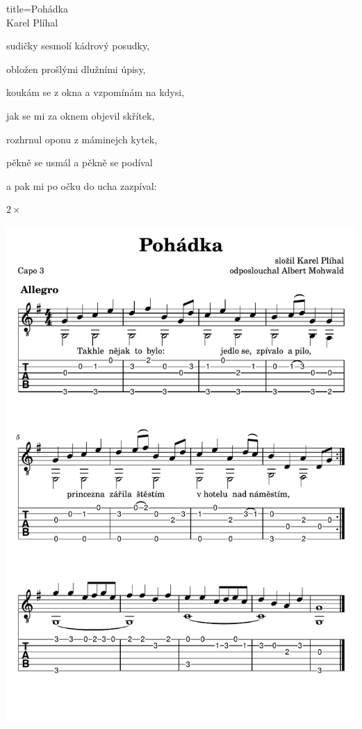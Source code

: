 \begin{song}{title=\predtitle\centering Pohádka \\\large Karel Plíhal\vspace*{-0.5cm}}
\begin{centerjustified}
sudičky sesmolí kádrový posudky,

obložen prošlými dlužními úpisy,

koukám se z okna a vzpomínám na kdysi,

jak se mi za oknem objevil skřítek,

rozhrnul oponu z máminejch kytek,

pěkně se usmál a pěkně se podíval

a pak mi po očku do ucha zazpíval:

 $2\times$

\end{centerjustified}

\newpage
\centering
\includegraphics[scale=1.1]{../taby/pohadka-komplet.pdf}

\setcounter{Slokočet}{0}
\end{song}
